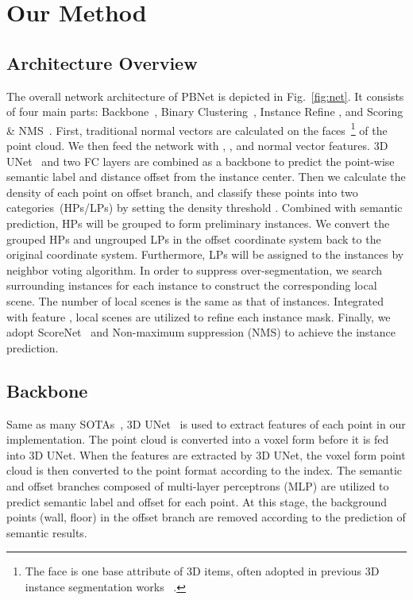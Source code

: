 \documentclass[10pt,twocolumn,letterpaper]{article}
\begin{document}
\section{Our Method}

\subsection{Architecture Overview}
The overall network architecture of PBNet is depicted in Fig.~\ref{fig:net}. It consists of four main parts: Backbone~, Binary Clustering~, Instance Refine , and Scoring \& NMS~. First, traditional normal vectors are calculated on the faces~\footnote{The face is one base attribute of 3D items, often adopted in previous 3D instance segmentation works ~\cite{liang2021instance, wu2022dknet}.} of the point cloud.   We then feed the network with , , and normal vector features. 3D UNet~\cite{li2019gs3d,ronneberger2015u} and two FC layers are combined as a backbone to predict the point-wise semantic label and distance offset from the instance center. Then we calculate the density of each point on offset branch, and classify these points into two categories~(HPs/LPs) by setting the density threshold . Combined with semantic prediction, HPs will be grouped to form preliminary instances. We convert the grouped HPs and ungrouped LPs in the offset coordinate system back to the original coordinate system. Furthermore, LPs will be assigned to the instances by neighbor voting algorithm. In order to suppress over-segmentation, we search surrounding instances for each instance to construct the corresponding local scene. The number of local scenes is the same as that of instances. Integrated with feature , local scenes are utilized to refine each instance mask. Finally, we adopt ScoreNet~\cite{jiang2020pointgroup} and Non-maximum suppression (NMS) to achieve the instance prediction. 

\subsection{Backbone}
\label{RE_2_1}
Same as many SOTAs~\cite{jiang2020pointgroup,chen2021hierarchical,liang2021instance,vu2022softgroup,wu2022dknet}, 3D UNet~\cite{li2019gs3d,ronneberger2015u} is used to extract features of each point in our implementation. The point cloud is converted into a voxel form before it is fed into 3D UNet. When the features are extracted by 3D UNet, the voxel form point cloud is then converted to the point format according to the index. The semantic and offset branches composed of multi-layer perceptrons (MLP) are utilized to predict semantic label and offset for each point. At this stage, the background points (wall, floor) in the offset branch are removed according to the prediction of semantic results.
\end{document}
